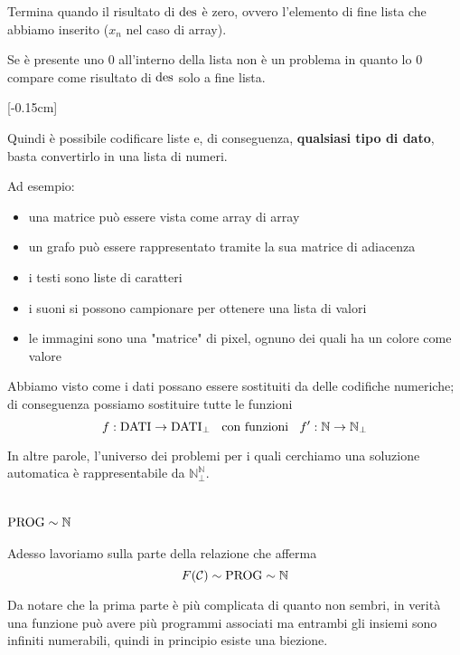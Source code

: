 Termina quando il risultato di $\operatorname{des}$ è zero, ovvero l'elemento di fine lista che abbiamo inserito ($x_n$ nel caso di array).
\begin{center}
	
\end{center}

Se è presente uno 0 all'interno della lista non è un problema in quanto lo 0 compare come risultato di $\operatorname{des}$ solo a fine lista.

[-0.15cm]

Quindi è possibile codificare liste e, di conseguenza, \textbf{qualsiasi tipo di dato}, basta convertirlo in una lista di numeri. 

Ad esempio:
\begin{itemize}
	\item una matrice può essere vista come array di array
	
    \item un grafo può essere rappresentato tramite la sua matrice di adiacenza
	
    \item i testi sono liste di caratteri
	
    \item i suoni si possono campionare per ottenere una lista di valori
	
    \item le immagini sono una "matrice" di pixel, ognuno dei quali ha un colore come valore
\end{itemize}

Abbiamo visto come i dati possano essere sostituiti da delle codifiche numeriche; di conseguenza possiamo sostituire tutte le funzioni
$$ f: \text{DATI} \rightarrow \text{DATI}_{\bot} \;\; \text{ con funzioni } \;\; f': \mathbb{N} \rightarrow \mathbb{N}_\bot $$

In altre parole, l'universo dei problemi per i quali cerchiamo una soluzione automatica è rappresentabile da $\mathbb{N}_\bot^{\mathbb{N}}$.

\section{$\text{PROG} \sim \mathbb{N}$}

Adesso lavoriamo sulla parte della relazione che afferma 
$$ F(\mathcal{C}) \sim \text{PROG} \sim \mathbb{N} $$

Da notare che la prima parte è più complicata di quanto non sembri, in verità una funzione può avere più programmi associati ma entrambi gli insiemi sono infiniti numerabili, quindi in principio esiste una biezione.

